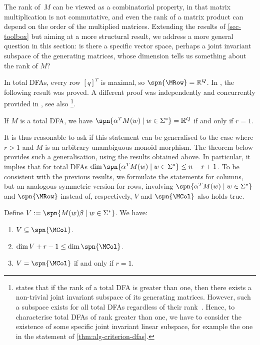 The rank of~$M$ can be viewed as a combinatorial property, in that matrix multiplication is not commutative, and even the rank of a matrix product can depend on the order of the multiplied matrices.
Extending the results of \autoref{sec-toolbox} but aiming at a more structural result, we address a more general question in this section: is there a specific vector space, perhaps a joint invariant subspace of the generating matrices, whose dimension tells us something about the rank of $M$? 

In total DFAs, every row $[q]^T$ is maximal, so $\spn{\MRow} = \mathbb{R}^Q$. In \cite[Criterion~1]{DBLP:journals/isci/BerlinkovS16}, the following result was proved. A different proof was independently and concurrently provided in \cite[\S8]{Voynov2015Compact}, see also \cite{Protasov2021}\footnote{ \cite[Theorem 2]{Protasov2021} states that if the rank of a total DFA is greater than one, then there exists a non-trivial joint invariant subspace of its generating matrices. However, such a subspace exists for all total DFAs regardless of their rank~\cite[Corollary 4]{Protasov2017}. 
Hence, to characterise total DFAs of rank greater than one, we have to consider the existence of some specific joint invariant linear subspace, for example the one in the statement of \autoref{thm:alg-criterion-dfas}.}.

\begin{thm}\label{thm:alg-criterion-dfas}
    If $M$ is a total DFA, we have 
    $\spn{\alpha^T M(w) \mid w \in \Sigma^*} = \mathbb{R}^Q$
    if and only if $r=1$.
\end{thm}

\noindent
It is thus reasonable to ask if this statement can be generalised to the case where $r > 1$ and $M$ is an arbitrary unambiguous monoid morphism. The theorem below provides such a generalisation, using the results obtained above. In particular, it implies that for total DFAs $\dim \spn{\alpha^T M(w) \mid w \in \Sigma^*} \le n - r + 1$. To be consistent with the previous results, we formulate the statements for columns, but an analogous symmetric version for rows, involving $\spn{\alpha^T M(w) \mid w \in \Sigma^*}$ and $\spn{\MRow}$ instead of, respectively, $V$ and $\spn{\MCol}$ also holds true. 

\begin{thm}\label{thm:algebraic}
Define $V := \spn{M(w) \beta \mid w \in \Sigma^*}$.
We have:
\begin{enumerate}
\item[(a)] $V \subseteq \spn{\MCol}$.
\item[(b)] $\dim V + r-1 \le \dim \spn{\MCol}$.
\item[(c)] $V = \spn{\MCol}$ if and only if $r=1$.
\end{enumerate}
\end{thm}

